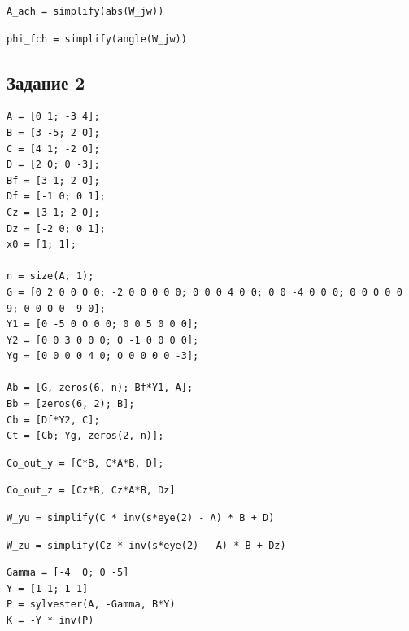 \documentclass[a4paper,12pt]{article}
\begin{document}
\begin{lstlisting}[caption={АЧХ}, label={lst:ach1}]
A_ach = simplify(abs(W_jw))
\end{lstlisting}

\begin{lstlisting}[caption={ФЧХ}, label={lst:fch1}]
phi_fch = simplify(angle(W_jw))
\end{lstlisting}

\newpage

\subsection*{Задание 2}

\begin{lstlisting}[caption={Инициализация}]
A = [0 1; -3 4];
B = [3 -5; 2 0];
C = [4 1; -2 0];
D = [2 0; 0 -3];
Bf = [3 1; 2 0];
Df = [-1 0; 0 1];
Cz = [3 1; 2 0];
Dz = [-2 0; 0 1];
x0 = [1; 1];

n = size(A, 1);
G = [0 2 0 0 0 0; -2 0 0 0 0 0; 0 0 0 4 0 0; 0 0 -4 0 0 0; 0 0 0 0 0 9; 0 0 0 0 -9 0];
Y1 = [0 -5 0 0 0 0; 0 0 5 0 0 0];
Y2 = [0 0 3 0 0 0; 0 -1 0 0 0 0];
Yg = [0 0 0 0 4 0; 0 0 0 0 0 -3];

Ab = [G, zeros(6, n); Bf*Y1, A];
Bb = [zeros(6, 2); B];
Cb = [Df*Y2, C];
Ct = [Cb; Yg, zeros(2, n)];
\end{lstlisting}

\begin{lstlisting}[caption={Исследование управляемости по выходу}, label={lst:Co_out_y2}]
Co_out_y = [C*B, C*A*B, D];
\end{lstlisting}	

	
\begin{lstlisting}[caption={Исследование управляемости по виртуальному выходу}, label={lst:Co_out_z2}]
Co_out_z = [Cz*B, Cz*A*B, Dz]
\end{lstlisting}

\begin{lstlisting}[caption={Передаточная матрица к выходу}, label={lst:W_yu}]
W_yu = simplify(C * inv(s*eye(2) - A) * B + D)
\end{lstlisting}

\begin{lstlisting}[caption={Передаточная матрица к виртуальному выходу}, label={lst:W_zu}]
W_zu = simplify(Cz * inv(s*eye(2) - A) * B + Dz)
\end{lstlisting}

\begin{lstlisting}[caption={Матрица регулятора \(K\)}, label={lst:sylv2}]
Gamma = [-4  0; 0 -5]
Y = [1 1; 1 1]
P = sylvester(A, -Gamma, B*Y)
K = -Y * inv(P)
\end{lstlisting}
\end{document}

